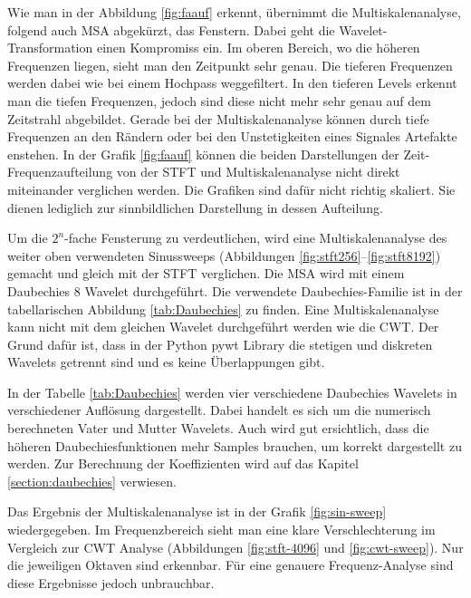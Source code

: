 Wie man in der Abbildung \ref{fig:faauf} erkennt, übernimmt die Multiskalenanalyse, folgend auch MSA abgekürzt, das Fenstern. Dabei geht die Wavelet-Transformation einen Kompromiss ein. Im oberen Bereich, wo die höheren Frequenzen liegen, sieht man den Zeitpunkt sehr genau. Die tieferen Frequenzen werden dabei wie bei einem Hochpass weggefiltert. In den tieferen Levels erkennt man die tiefen Frequenzen, jedoch sind diese nicht mehr sehr genau auf dem Zeitstrahl abgebildet. Gerade bei der Multiskalenanalyse können durch tiefe Frequenzen an den Rändern oder bei den Unstetigkeiten eines Signales Artefakte enstehen. In der Grafik \ref{fig:faauf} können die beiden Darstellungen der Zeit-Frequenzaufteilung von der STFT und Multiskalenanalyse nicht direkt miteinander verglichen werden. Die Grafiken sind dafür nicht richtig skaliert. Sie dienen lediglich zur sinnbildlichen Darstellung in dessen Aufteilung.

Um die $2^{n}$-fache Fensterung zu verdeutlichen, wird eine  Multiskalenanalyse des weiter oben verwendeten Sinussweeps (Abbildungen \ref{fig:stft256}--\ref{fig:stft8192}) gemacht und gleich mit der STFT verglichen.
Die MSA wird mit einem Daubechies 8 Wavelet durchgeführt. Die verwendete Daubechies-Familie ist in der tabellarischen Abbildung \ref{tab:Daubechies} zu finden. Eine Multiskalenanalyse kann nicht mit dem gleichen Wavelet durchgeführt werden wie die CWT. Der Grund dafür ist, dass in der Python pywt Library die stetigen und diskreten Wavelets getrennt sind und es keine Überlappungen gibt.

In der Tabelle \ref{tab:Daubechies} werden vier verschiedene Daubechies Wavelets in verschiedener Auflösung dargestellt. Dabei handelt es sich um die numerisch berechneten Vater und Mutter Wavelets. Auch wird gut ersichtlich, dass die höheren Daubechiesfunktionen mehr Samples brauchen, um korrekt dargestellt zu werden. Zur Berechnung der Koeffizienten wird auf das Kapitel \ref{section:daubechies} verwiesen.


Das Ergebnis der Multiskalenanalyse ist in der Grafik \ref{fig:sin-sweep} wiedergegeben. Im Frequenzbereich sieht man eine klare Verschlechterung im Vergleich zur CWT Analyse (Abbildungen \ref{fig:stft-4096} und \ref{fig:cwt-sweep}).
Nur die jeweiligen Oktaven sind erkennbar. Für eine genauere Frequenz-Analyse sind diese Ergebnisse jedoch unbrauchbar.  




